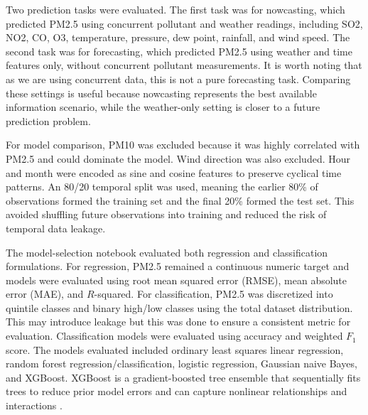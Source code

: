 \documentclass[stu,12pt,floatsintext]{apa7}
\begin{document}
Two prediction tasks were evaluated. The first task was for nowcasting, which
predicted PM2.5 using concurrent pollutant and weather readings, including SO2, NO2, CO,
O3, temperature, pressure, dew point, rainfall, and wind speed. The second task was for
forecasting, which predicted PM2.5 using weather and time features only,
without concurrent pollutant measurements. It is worth noting that as we are using concurrent 
data, this is not a pure forecasting task. Comparing these settings is useful because
nowcasting represents the best available information scenario, while the weather-only
setting is closer to a future prediction problem.

For model comparison, PM10 was excluded because it was highly correlated with PM2.5 and
could dominate the model. Wind direction was also excluded. 
Hour and month were encoded as sine and cosine features to preserve cyclical
time patterns. An 80/20 temporal split was used, meaning the earlier 80\% of observations formed the training set and the final
20\% formed the test set. This avoided shuffling future observations into training and
reduced the risk of temporal data leakage.

The model-selection notebook evaluated both regression and classification formulations.
For regression, PM2.5 remained a continuous numeric target and models were evaluated
using root mean squared error (RMSE), mean absolute error (MAE), and $R$-squared. For
classification, PM2.5 was discretized into quintile classes and binary high/low classes
using the total dataset distribution. This may introduce leakage but this was done to ensure 
a consistent metric for evaluation.
Classification models were evaluated using accuracy and
weighted $F_1$ score. The models evaluated included ordinary least squares linear
regression, random forest regression/classification, logistic regression, Gaussian naive
Bayes, and XGBoost. XGBoost is a gradient-boosted tree ensemble that sequentially fits
trees to reduce prior model errors and can capture nonlinear relationships and
interactions \parencite{ChenGuestrin2016}.
\end{document}
